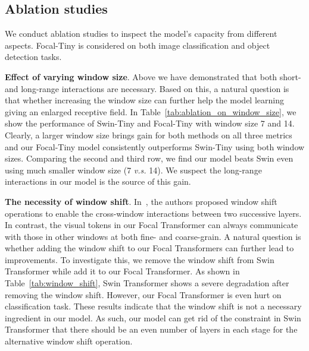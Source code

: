 \documentclass{article}
\begin{document}
\subsection{Ablation studies}

We conduct ablation studies to inspect the model's capacity from different aspects. Focal-Tiny is considered on both image classification and object detection tasks.


\textbf{Effect of varying window size}. Above we have demonstrated that both short- and long-range interactions are necessary. Based on this, a natural question is that whether increasing the window size can further help the model learning giving an enlarged receptive field. In  Table~\ref{tab:ablation_on_window_size}, we show the performance of Swin-Tiny and Focal-Tiny with window size 7 and 14. Clearly, a larger window size brings gain for both methods on all three metrics and our Focal-Tiny model consistently outperforms Swin-Tiny using both window sizes. Comparing the second and third row, we find our model beats Swin even using much smaller window size (7 \textit{v.s.} 14). We suspect the long-range interactions in our model is the source of this gain.


\textbf{The necessity of window shift}. In~\cite{liu2021swin}, the authors proposed window shift operations to enable the cross-window interactions between two successive layers. In contrast, the visual tokens in our Focal Transformer can always communicate with those in other windows at both fine- and coarse-grain. A natural question is whether adding the window shift to our Focal Transformers can further lead to improvements. To investigate this, we remove the window shift from Swin Transformer while add it to our Focal Transformer. As shown in Table~\ref{tab:window_shift}, Swin Transformer shows a severe degradation after removing the window shift. However, our Focal Transformer is even hurt on classification task. These results indicate that the window shift is not a necessary ingredient in our model. As such, our model can get rid of the constraint in Swin Transformer that there should be an even number of layers in each stage for the alternative window shift operation.
\end{document}
